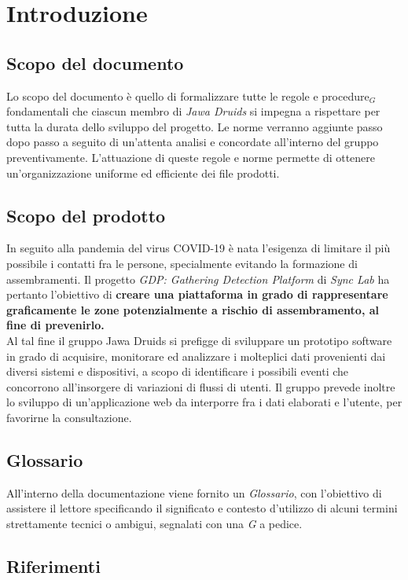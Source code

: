 \chapter{Introduzione}\label{Introduzione}

\section{Scopo del documento}\label{IntroduzioneScopoDelDocumento}
Lo scopo del documento è quello di formalizzare tutte le regole e procedure$_G$ fondamentali che ciascun membro di \textit{Jawa Druids} si impegna a rispettare per tutta la durata dello sviluppo del progetto. 
Le norme verranno aggiunte passo dopo passo a seguito di un'attenta analisi e concordate all'interno del gruppo preventivamente. L'attuazione di queste regole e norme permette di ottenere un'organizzazione uniforme ed efficiente dei file prodotti.
\section{Scopo del prodotto}\label{1.2}
In seguito alla pandemia del virus COVID-19 è nata l'esigenza di limitare il più possibile i contatti fra le persone, specialmente evitando la formazione di assembramenti. Il progetto \textit{GDP: Gathering Detection Platform} di \textit{Sync Lab} ha pertanto l'obiettivo di \textbf{creare una piattaforma in grado di rappresentare graficamente le zone potenzialmente a rischio di assembramento, al fine di prevenirlo.}\\
Al tal fine il gruppo Jawa Druids si prefigge di sviluppare un prototipo software in grado di acquisire, monitorare ed analizzare i molteplici dati provenienti dai diversi sistemi e dispositivi, a scopo di identificare i possibili eventi che concorrono all’insorgere di variazioni di flussi di utenti. Il gruppo prevede inoltre lo sviluppo di un'applicazione web da interporre fra i dati elaborati e l'utente, per favorirne la consultazione.
\section{Glossario}\label{1.3}
All'interno della documentazione viene fornito un \textit{Glossario}, con l'obiettivo di assistere il lettore specificando il significato e contesto d'utilizzo di alcuni termini strettamente tecnici o ambigui, segnalati con una \textit{G} a pedice.

\section{Riferimenti}\label{IntroduzioneRiferimenti}
